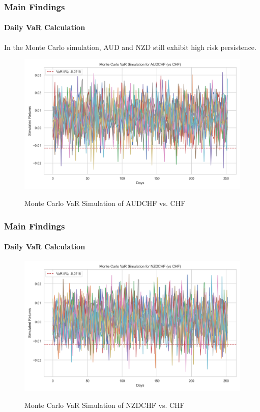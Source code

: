 \documentclass[10pt]{beamer}
\begin{document}
\begin{frame}
\frametitle{Main Findings}
\framesubtitle{Daily VaR Calculation}
In the Monte Carlo simulation, AUD and NZD still exhibit high risk persistence.

\begin{figure}[h]
    \centering   \includegraphics[width=0.9\linewidth]{../../reports/figures/monte_carlo_var_simulation_AUDCHF_vs_CHF.png}  \label{fig:monte_carlo_var_simulation_AUDCHF_vs_CHF}
    
    \caption{\footnotesize Monte Carlo VaR Simulation of AUDCHF vs. CHF}  
\end{figure}
\end{frame}
\begin{frame}
\frametitle{Main Findings}
\framesubtitle{Daily VaR Calculation}
\begin{figure}[h]
    \centering     \includegraphics[width=0.9\linewidth]{../../reports/figures/monte_carlo_var_simulation_NZDCHF_vs_CHF.png}   \label{fig:monte_carlo_var_simulation_NZDCHF_vs_CHF}
\caption{\footnotesize Monte Carlo VaR Simulation of NZDCHF vs. CHF}
\end{figure}
\end{frame}
\end{document}
